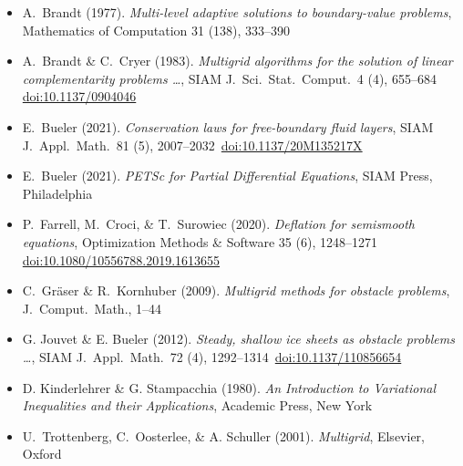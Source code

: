 
\newcommand{\shref}[2]{\,{\tiny \href{#1}{#2}}}
\begin{itemize}
\item[] A.~Brandt (1977). \emph{Multi-level adaptive solutions to boundary-value problems}, Mathematics of Computation 31 (138), 333--390
\item[] A.~Brandt \& C.~Cryer (1983). \emph{Multigrid algorithms for the solution of linear complementarity problems \dots}, SIAM J.~Sci.~Stat.~Comput.~4 (4), 655--684 \shref{https://doi.org/10.1137/0904046}{doi:10.1137/0904046}
\item[] E.~Bueler (2021). \emph{Conservation laws for free-boundary fluid layers}, SIAM J.~Appl.~Math.~81 (5), 2007--2032 \shref{https://doi.org/10.1137/20M135217X}{doi:10.1137/20M135217X}
\item[] E.~Bueler (2021). \emph{PETSc for Partial Differential Equations}, SIAM Press, Philadelphia
\item[] P.~Farrell, M.~Croci, \& T.~Surowiec (2020). \emph{Deflation for semismooth equations}, Optimization Methods \& Software 35 (6), 1248--1271 \shref{https://doi.org/10.1080/10556788.2019.1613655}{doi:10.1080/10556788.2019.1613655}
\item[] C.~Gr{\"a}ser \& R.~Kornhuber (2009). \emph{Multigrid methods for obstacle problems}, J.~Comput.~Math., 1--44
\item[] G. Jouvet \& E. Bueler (2012). \emph{Steady, shallow ice sheets as obstacle problems \dots}, SIAM J.~Appl.~Math.~72 (4), 1292--1314 \shref{https://doi.org/10.1137/110856654}{doi:10.1137/110856654}
\item[] D. Kinderlehrer \& G. Stampacchia (1980). \emph{An Introduction to Variational Inequalities and their Applications}, Academic Press, New York
\item[] U.~Trottenberg, C.~Oosterlee, \& A. Schuller (2001).  \emph{Multigrid}, Elsevier, Oxford
\end{itemize}

